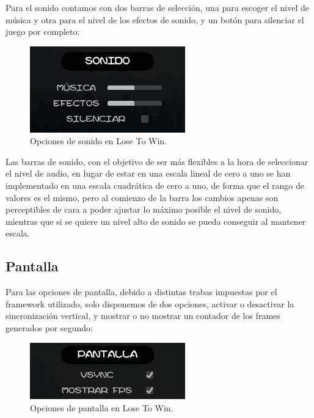 \documentclass[12pt, spanish]{article}
\begin{document}
Para el sonido contamos con dos barras de selección, una para escoger el nivel de música y otra para el nivel de los efectos de sonido, y un botón para silenciar el juego por completo:

\begin{figure}[H]
	\centering
	\includegraphics[width=0.6\textwidth]{"opciones/sonido.png"}
	\caption{Opciones de sonido en Lose To Win.}\label{figure:sonido}
\end{figure}


Las barras de sonido, con el objetivo de ser más flexibles a la hora de seleccionar el nivel de audio, en lugar de estar en una escala lineal de cero a uno se han implementado en una escala cuadrática de cero a uno, de forma que el rango de valores es el mismo, pero al comienzo de la barra los cambios apenas son perceptibles de cara a poder ajustar lo máximo posible el nivel de sonido, mientras que si se quiere un nivel alto de sonido se pueda conseguir al mantener escala.

\subsection{Pantalla}

Para las opciones de pantalla, debido a distintas trabas impuestas por el framework utilizado, solo disponemos de dos opciones, activar o desactivar la sincronización vertical, y mostrar o no mostrar un contador de los frames generados por segundo:

\begin{figure}[H]
	\centering
	\includegraphics[width=0.6\textwidth]{"opciones/pantalla.png"}
	\caption{Opciones de pantalla en Lose To Win.}\label{figure:pantalla}
\end{figure}
\end{document}
